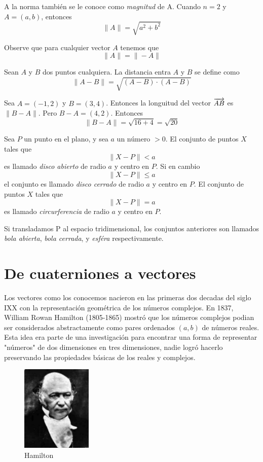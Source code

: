 A la norma también se le conoce como \emph{magnitud} de A. Cuando $n=2$ y $A = (a,b)$, entonces
    $$ \| A \| = \sqrt{a^{2} + b^{2}} $$

Observe que para cualquier vector $A$ tenemos que 
$$ \| A \| = \| -A \| $$

\begin{definition}
    Sean $A$ y $B$ dos puntos cualquiera. La distancia entra $A$ y $B$ se define como
    $$ \| A - B \| = \sqrt{(A-B) \cdot (A-B)} $$
\end{definition}

\begin{myExample}
    Sea $A = (-1,2)$ y $B = (3,4)$. Entonces la longuitud del vector $\overrightarrow{AB}$ es $\|B-A\|$. Pero
    $B-A = (4,2)$. Entonces
    $$\|B-A\| = \sqrt{16+4} = \sqrt{20} $$
\end{myExample}

Sea $P$ un punto en el plano, y sea $a$ un número $> 0$. El conjunto de puntos $X$ tales que
$$ \| X - P \| < a $$
es llamado \emph{disco abierto} de radio $a$ y centro en $P$. Si en cambio
$$ \| X - P \| \le a $$
el conjunto es llamado \emph{disco cerrado} de radio $a$ y centro en $P$. El conjunto de puntos
$X$ tales que
$$ \| X - P \| = a $$
es llamado \emph{circurferencia} de radio $a$ y centro en $P$.

Si transladamos P al espacio tridimensional, los conjuntos anteriores son llamados \emph{bola abierta},
\emph{bola cerrada}, y \emph{esféra} respectivamente.

\section{De cuaterniones a vectores}
Los vectores como los conocemos nacieron en las primeras dos decadas del siglo IXX con la representación
geométrica de los números complejos. En 1837, William Rowan Hamilton (1805-1865) mostró que los números
complejos podian ser considerados abstractamente como pares ordenados $(a,b)$ de números reales. Esta idea
era parte de una investigación para encontrar una forma de representar "números" de dos dimensiones en tres
dimensiones, nadie logró hacerlo preservando las propiedades básicas de los reales y complejos. \\

\begin{figure}[!ht]
  \begin{center}
    \includegraphics[width=0.3\textwidth]{gfx/hamilton}
  \end{center}
  \caption{Hamilton}
\end{figure}

